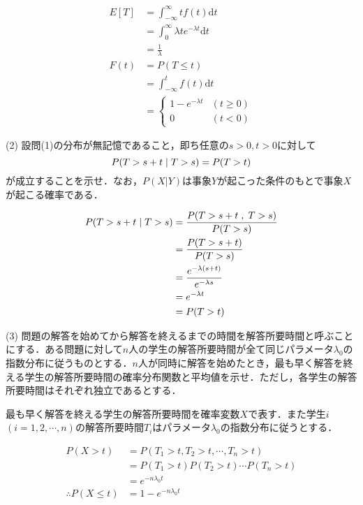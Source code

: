 \documentclass[a4j]{jarticle}
\newcommand{\intd}[1]{
  \mathrm{d} #1
}
\begin{document}
\begin{align*}
 E\left[T\right] &= \int_{-\infty}^{\infty} t f(t) \intd{t} \\
 &= \int_0^\infty \lambda t e^{-\lambda t} \intd{t} \\
 &= \frac{1}{\lambda} \\
 F(t) &= P(T \leq t) \\
 &= \int_{-\infty}^t  f(t) \intd{t} \\
 &=
\begin{cases}
 1  - e^{-\lambda t} &(t \geq 0) \\
 0 &(t<0)
\end{cases}
\end{align*}

\begin{screen}
 (2) 設問(1)の分布が無記憶であること，即ち任意の$s>0,t>0$に対して
 $$P(T>s+t \hspace{1mm}|\hspace{1mm} T>s ) = P(T>t)$$
 が成立することを示せ．なお，$P(X|Y)$は事象$Y$が起こった条件のもとで事象$X$が起こる確率である．
\end{screen}

\begin{align*}
 P(T>s+t \hspace{1mm}|\hspace{1mm} T>s ) &= \frac{P(T>s+t \hspace{1mm},\hspace{1mm} T>s )}{P(T>s)} \\
 &= \frac{P(T>s+t)}{P(T>s)} \\
 &= \frac{e^{-\lambda(s+t)}}{e^{-\lambda s}} \\
 &= e^{-\lambda t} \\
 &= P(T>t)
\end{align*}

\begin{screen}
 (3) 問題の解答を始めてから解答を終えるまでの時間を解答所要時間と呼ぶことにする．ある問題に対して$n$人の学生の解答所要時間が全て同じパラメータ$\lambda_0$の指数分布に従うものとする．$n$人が同時に解答を始めたとき，最も早く解答を終える学生の解答所要時間の確率分布関数と平均値を示せ．ただし，各学生の解答所要時間はそれぞれ独立であるとする．
\end{screen}

最も早く解答を終える学生の解答所要時間を確率変数$X$で表す．また学生$i$ $(i=1,2,\cdots,n)$の解答所要時間$T_i$はパラメータ$\lambda_0$の指数分布に従うとする．

\begin{align*}
 P(X > t) &= P(T_1 > t , T_2 > t , \cdots , T_{n} > t) \\
 &= P(T_1 > t)P(T_2 > t)\cdots P(T_{n} > t) \\
 &= e^{-n\lambda_0t} \\
 \therefore P(X \leq t)&=1-e^{-n\lambda_0t}
\end{align*}
\end{document}
